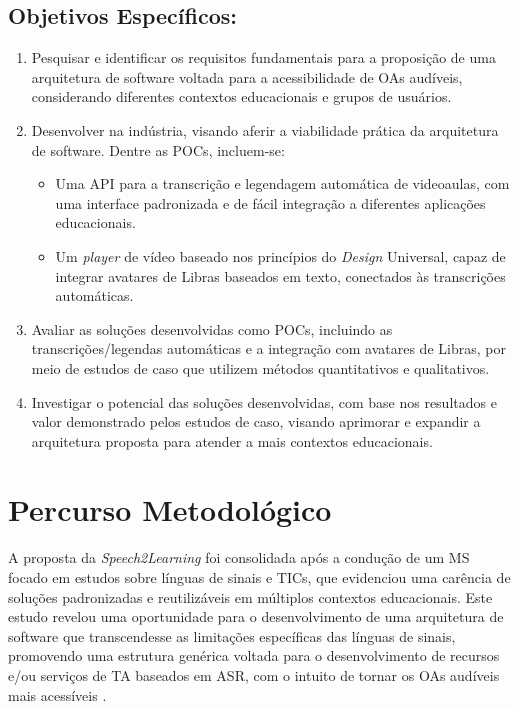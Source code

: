 \subsection*{Objetivos Específicos:}

\begin{enumerate}
\item Pesquisar e identificar os requisitos fundamentais para a proposição de uma arquitetura de software voltada para a acessibilidade de OAs audíveis, considerando diferentes contextos educacionais e grupos de usuários.
\item Desenvolver  na indústria, visando aferir a viabilidade prática da arquitetura de software. Dentre as POCs, incluem-se:
\begin{itemize}
\item Uma API para a transcrição e legendagem automática de videoaulas, com uma interface padronizada e de fácil integração a diferentes aplicações educacionais.
\item Um \textit{player} de vídeo baseado nos princípios do \textit{Design} Universal, capaz de integrar avatares de Libras baseados em texto, conectados às transcrições automáticas.
\end{itemize}
\item Avaliar as soluções desenvolvidas como POCs, incluindo as transcrições/legendas automáticas e a integração com avatares de Libras, por meio de estudos de caso que utilizem métodos quantitativos e qualitativos.
\item Investigar o potencial das soluções desenvolvidas, com base nos resultados e valor demonstrado pelos estudos de caso, visando aprimorar e expandir a arquitetura proposta para atender a mais contextos educacionais.
\end{enumerate}

\section{Percurso Metodológico}

A proposta da \textit{Speech2Learning} foi consolidada após a condução de um MS focado em estudos sobre línguas de sinais e TICs, que evidenciou uma carência de soluções padronizadas e reutilizáveis em múltiplos contextos educacionais. Este estudo revelou uma oportunidade para o desenvolvimento de uma arquitetura de software que transcendesse as limitações específicas das línguas de sinais, promovendo uma estrutura genérica voltada para o desenvolvimento de recursos e/ou serviços de TA baseados em ASR, com o intuito de tornar os OAs audíveis mais acessíveis \cite{FalvoJr2020_FIE, FalvoJr2020_SBIE, FalvoJr2021_RENOTE}.

